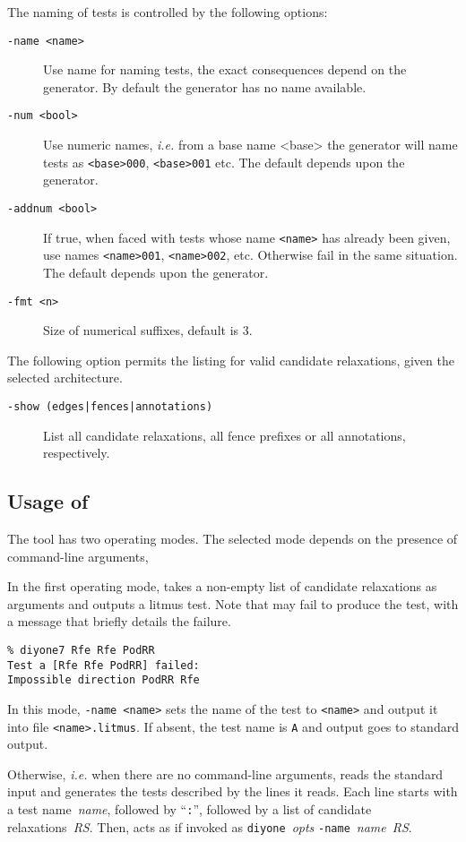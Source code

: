 The naming of tests is controlled by the following options:
\begin{description}
\item[{\tt -name <name>}] Use name for naming tests, the exact consequences
depend on the generator. By default the generator has no name available.
\item[{\tt -num <bool>}] Use numeric names, \emph{i.e.} from a base name
<base> the generator will name tests as \texttt{<base>000}, \texttt{<base>001} etc. The default depends upon the generator.
\item[{\tt -addnum <bool>}] If true, when faced with tests whose name
\texttt{<name>} has already been given, use names
\texttt{<name>001}, \texttt{<name>002}, etc.
Otherwise fail in the same situation.
The default depends upon the generator.
\item[{\tt -fmt <n>}] Size of numerical suffixes, default is 3.
\end{description}

The following option permits the listing for valid candidate relaxations,
given the selected architecture.
\begin{description}
\item[{\tt -show (edges|fences|annotations)}]
List all candidate relaxations, all fence prefixes or all annotations, respectively.
\end{description}

\subsection{Usage\label{diyone:usage} of \diyone}
The tool 
has two operating modes.
The selected mode depends on the presence of command-line arguments,

In the first operating mode, \diyone{}
takes a non-empty list of candidate relaxations as arguments
and outputs a litmus test.
Note that \diyone{} may fail to produce the test, with a message
that briefly details the failure.
\begin{verbatim}
% diyone7 Rfe Rfe PodRR
Test a [Rfe Rfe PodRR] failed:
Impossible direction PodRR Rfe
\end{verbatim}

In this mode, {\tt -name <name>} sets the name of the test to \texttt{<name>}
and output it into file \texttt{<name>.litmus}.
If absent, the test name is \texttt{A} and output goes to standard output.


Otherwise, \emph{i.e.} when there are no command-line arguments,
\diyone{} reads the standard input and generates the tests described
by the lines it reads.
Each line starts with a test name~\textit{name},
followed by ``\texttt{:}'', followed
by a list of candidate relaxations~\textit{RS}.
Then, \diyone{} acts as if invoked as \texttt{diyone}~\textit{opts}
\texttt{-name}~\textit{name}~\textit{RS}.

